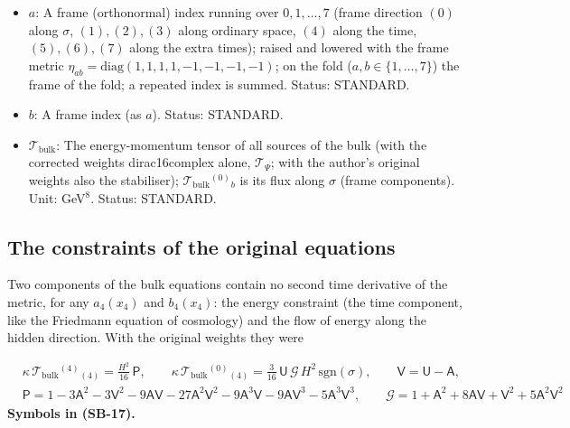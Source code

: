 \documentclass[
  10pt,
]{article}
\begin{document}
\begin{itemize}
  (FD-11, the junction conditions); \(\mathcal{S}^4{}_4\) is minus its
  energy density, \(\mathcal{S}^1{}_1\) and \(\mathcal{S}^5{}_5\) its
  pressures along ordinary space and along the extra times (frame
  components along the fold, eight-dimensional normalisation: an energy
  per unit volume of the six other directions of the fold). Unit:
  GeV\(^7\). Value:
  \(\kappa\mathcal{S}^a{}_b = -\frac{32}{5}H\delta^a{}_b\) at the static
  block. Status: DERIVED.
\item
  \(a\): A frame (orthonormal) index running over \(0, 1, \dots, 7\)
  (frame direction \((0)\) along \(\sigma\), \((1), (2), (3)\) along
  ordinary space, \((4)\) along the time, \((5), (6), (7)\) along the
  extra times); raised and lowered with the frame metric
  \(\eta_{ab} = \mathrm{diag}(1, 1, 1, 1, -1, -1, -1, -1)\); on the fold
  (\(a, b \in \{1, \dots, 7\}\)) the frame of the fold; a repeated index
  is summed. Status: STANDARD.
\item
  \(b\): A frame index (as \(a\)). Status: STANDARD.
\item
  \(\mathcal{T}_{\mathrm{bulk}}\): The energy-momentum tensor of all
  sources of the bulk (with the corrected weights dirac16complex alone,
  \(\mathcal{T}_\Psi\); with the author's original weights also the
  stabiliser); \(\mathcal{T}_{\mathrm{bulk}}{}^{(0)}{}_b\) is its flux
  along \(\sigma\) (frame components). Unit: GeV\(^8\). Status:
  STANDARD.
\end{itemize}

\hypertarget{the-constraints-of-the-original-equations}{%
\subsection{The constraints of the original
equations}\label{the-constraints-of-the-original-equations}}

Two components of the bulk equations contain no second time derivative
of the metric, for any \(a_4(x_4)\) and \(b_4(x_4)\): the energy
constraint (the time component, like the Friedmann equation of
cosmology) and the flow of energy along the hidden direction. With the
original weights they were

\[
\begin{aligned}
&\kappa\,\mathcal{T}_{\mathrm{bulk}}{}^{(4)}{}_{(4)} = \frac{H^2}{16}\,\mathsf{P},\qquad
 \kappa\,\mathcal{T}_{\mathrm{bulk}}{}^{(0)}{}_{(4)} = \frac{3}{16}\,\mathsf{U}\,\mathcal{G}\,H^2\,\mathrm{sgn}(\sigma),\qquad \mathsf{V} = \mathsf{U} - \mathsf{A},\\
&\mathsf{P} = 1 - 3\mathsf{A}^2 - 3\mathsf{V}^2 - 9\mathsf{A}\mathsf{V} - 27\mathsf{A}^2\mathsf{V}^2 - 9\mathsf{A}^3\mathsf{V} - 9\mathsf{A}\mathsf{V}^3 - 5\mathsf{A}^3\mathsf{V}^3,\qquad
 \mathcal{G} = 1 + \mathsf{A}^2 + 8\mathsf{A}\mathsf{V} + \mathsf{V}^2 + 5\mathsf{A}^2\mathsf{V}^2
\end{aligned} \tag{SB-17}
\] \textbf{Symbols in (SB-17).}
\end{document}
